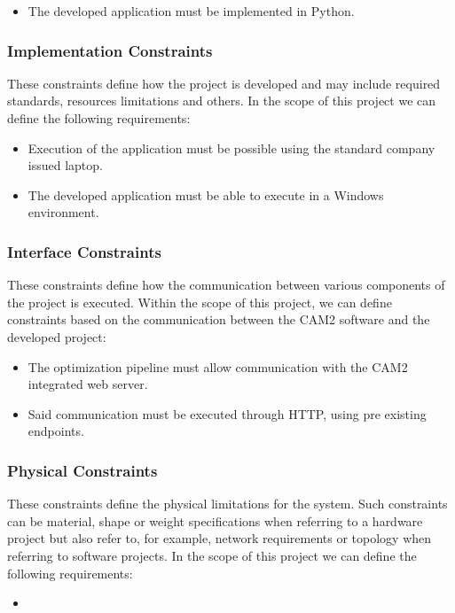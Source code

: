 \begin{itemize}
	\item The developed application must be implemented in Python.
\end{itemize}

\subsubsection{Implementation Constraints} 

These constraints define how the project is developed and may include required standards, resources limitations and others. In the scope of this project we can define the following requirements:

\begin{itemize}
	\item Execution of the application must be possible using the standard company issued laptop.
	\item The developed application must be able to execute in a Windows environment.
\end{itemize}

\subsubsection{Interface Constraints} 

These constraints define how the communication between various components of the project is executed. Within the scope of this project, we can define constraints based on the communication between the CAM2\textsuperscript{\textregistered} software and the developed project:

\begin{itemize}
	\item The optimization pipeline must allow communication with the CAM2\textsuperscript{\textregistered} integrated web server.
	\item Said communication must be executed through HTTP, using pre existing endpoints.
\end{itemize}

\subsubsection{Physical Constraints}

These constraints define the physical limitations for the system. Such constraints can be material, shape or weight specifications when referring to a hardware project but also refer to, for example, network requirements or topology when referring to software projects. In the scope of this project we can define the following requirements:

\begin{itemize}
	\item 
\end{itemize}
